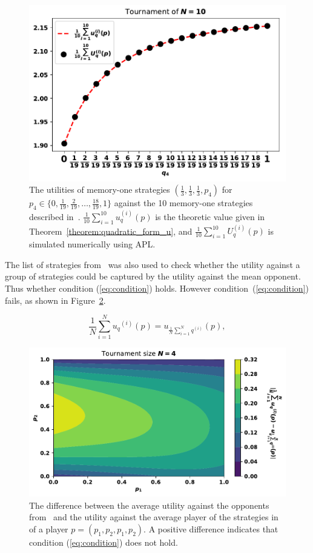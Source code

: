 \begin{figure}[!htbp]
    \begin{center}
    \includegraphics[width=.5\linewidth]{src/chapters/05/paper/memory-size-in-the-prisoners-dilemma/img/Stewart_tournament_results.pdf}
    \caption{The utilities of memory-one strategies \((\frac{1}{3}, \frac{1}{3}, \frac{1}{3}, p_4)\) for
    \(p_4 \in \{0,  \frac{1}{19}, \frac{2}{19}, \dots, \frac{18}{19}, 1\}\)
    against the 10 memory-one strategies described in~\cite{Stewart2012}.
    \(\frac{1}{10} \sum^{10}_{i=1} u_q^{(i)}(p)\) is the theoretic value given in
    Theorem~\ref{theorem:quadratic_form_u},
    and \(\frac{1}{10} \sum^{10}_{i=1} U_q^{(i)}(p)\) is simulated numerically
    using APL.}
    \label{fig:stewart_plotkin_results}
    \end{center}
\end{figure}

The list of strategies from~\cite{Stewart2012} was also used to check whether
the utility against a group of strategies could be captured by the utility
against the mean opponent. Thus whether condition (\ref{eq:condition}) holds.
However condition~(\ref{eq:condition}) fails, as shown in
Figure~\ref{fig:hypothesis}.

\begin{equation}\label{eq:condition}
    \frac{1}{N} \sum_{i=1} ^ {N} {u_q}^{(i)} (p) = u_{\frac {1}{N} \sum\limits_{i=1} ^ N q^{(i)}}(p),
\end{equation}

\begin{figure}[!htbp]
    \begin{center}
    \includegraphics[width=.6\linewidth]{src/chapters/05/paper/memory-size-in-the-prisoners-dilemma/img/mean_vs_average_heatmap.pdf}
    \end{center}
    \caption{The difference between the average utility against the opponents
    from~\cite{Stewart2012} and the utility against the average player of the
    strategies in~\cite{Stewart2012} of a player \(p=(p_1, p_2, p_1, p_2)\). A
    positive difference indicates that condition (\ref{eq:condition}) does not
    hold.}
    \label{fig:hypothesis}
\end{figure}

